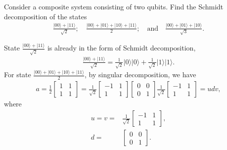 \documentclass[en]{sol-man}
\begin{document}
\begin{exe}
    Consider a composite system consisting of two qubits. Find the Schmidt decomposition of the states
    \begin{align}
        \frac{\lvert 00\rangle+\lvert 11\rangle}{\sqrt{2}};\quad\frac{\lvert 00\rangle+\lvert 01\rangle+\lvert 10\rangle+\lvert 11\rangle}{2};\quad\text{and}\quad\frac{\lvert 00\rangle+\lvert 01\rangle+\lvert 10\rangle}{\sqrt{3}}.
    \end{align}
\end{exe}
\begin{pf}
    State $\frac{\lvert 00\rangle+\lvert 11\rangle}{\sqrt{2}}$ is already in the form of Schmidt decomposition,
    \begin{align}
        \frac{\lvert 00\rangle+\lvert 11\rangle}{\sqrt{2}}=\frac{1}{\sqrt{2}}\lvert 0\rangle\lvert 0\rangle+\frac{1}{\sqrt{2}}\lvert 1\rangle\lvert 1\rangle.
    \end{align}
    For state $\frac{\lvert 00\rangle+\lvert 01\rangle+\lvert 10\rangle+\lvert 11\rangle}{2}$, by singular decomposition, we have
    \begin{align}
        a=\frac{1}{2}\begin{bmatrix}
            1&1\\
            1&1
        \end{bmatrix}=\frac{1}{\sqrt{2}}\begin{bmatrix}
            -1&1\\
            1&1
        \end{bmatrix}\begin{bmatrix}
            0&0\\
            0&1
        \end{bmatrix}\frac{1}{\sqrt{2}}\begin{bmatrix}
            -1&1\\
            1&1
        \end{bmatrix}=udv,
    \end{align}
    where
    \begin{align}
        u=v=&\frac{1}{\sqrt{2}}\begin{bmatrix}
            -1&1\\
            1&1
        \end{bmatrix},\\
        d=&\begin{bmatrix}
            0&0\\
            0&1
        \end{bmatrix}.
    \end{align}

\end{pf}
\end{document}
